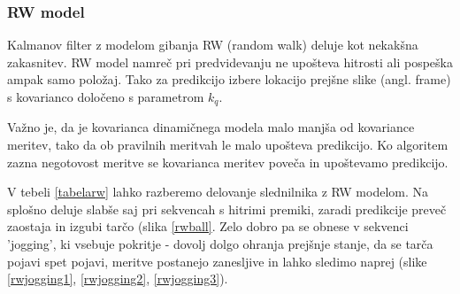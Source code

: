 \documentclass[a4paper]{article}
\begin{document}
\subsubsection{RW model}
Kalmanov filter z modelom gibanja RW (random walk) deluje kot nekakšna zakasnitev. RW model namreč pri predvidevanju ne upošteva hitrosti ali pospeška ampak samo položaj. Tako za predikcijo izbere lokacijo prejšne slike (angl. frame) s kovarianco določeno s parametrom $k_q$. 

Važno je, da je kovarianca dinamičnega modela malo manjša od kovariance meritev, tako da ob pravilnih meritvah le malo upošteva predikcijo. Ko algoritem zazna negotovost meritve se kovarianca meritev poveča in upoštevamo predikcijo.  

V tebeli \ref{tabelarw} lahko razberemo delovanje slednilnika z RW modelom. Na splošno deluje slabše saj pri sekvencah s hitrimi premiki, zaradi predikcije preveč zaostaja in izgubi tarčo (slika \ref{rwball}. Zelo dobro pa se obnese v sekvenci 'jogging', ki vsebuje pokritje - dovolj dolgo ohranja prejšnje stanje, da se tarča pojavi spet pojavi, meritve postanejo zanesljive in lahko sledimo naprej (slike \ref{rwjogging1}, \ref{rwjogging2}, \ref{rwjogging3}). 
\end{document}
